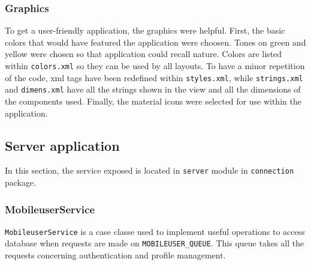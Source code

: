 \documentclass[a4paper,12pt]{report}
\begin{document}
\subsubsection{Graphics}
To get a user-friendly application, the graphics were helpful. First, the basic colors that would have featured the application were choosen. Tones on green and yellow were chosen so that application could recall nature. Colors are listed within \texttt{colors.xml} so they can be used by all layouts. To have a minor repetition of the code, xml tags have been redefined within \texttt{styles.xml}, while \texttt{strings.xml} and \texttt{dimens.xml} have all the strings shown in the view and all the dimensions of the components used. Finally, the material icons were selected for use within the application.

\subsection{Server application}
In this section, the service exposed is located in \texttt{server} module in \texttt{connection} package.

\subsubsection{MobileuserService}
\texttt{MobileuserService} is a case classe used to implement useful operations to access database when requests are made on \texttt{MOBILEUSER\_QUEUE}. This queue takes all the requests concerning authentication and profile management.
\end{document}
